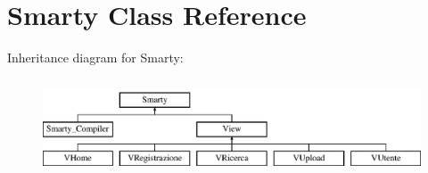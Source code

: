 \hypertarget{class_smarty}{}\section{Smarty Class Reference}
\label{class_smarty}
Inheritance diagram for Smarty\+:\begin{figure}[H]
\begin{center}
\leavevmode
\includegraphics[height=2.896552cm]{class_smarty}
\end{center}
\end{figure}
